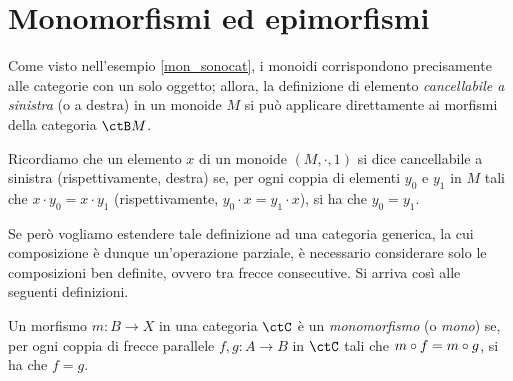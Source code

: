 \section{Monomorfismi ed epimorfismi}\label{sec_monoepi}

Come visto nell'esempio \ref{mon_sonocat}, i monoidi corrispondono precisamente alle categorie con un solo oggetto; allora,
la definizione di elemento \emph{cancellabile a sinistra} (o a destra) in un monoide \(M\) si può applicare direttamente ai morfismi della categoria \(\ctB M\).

Ricordiamo che un elemento \(x\) di un monoide \((M, \cdot, 1)\) si dice cancellabile a sinistra (rispettivamente, destra) se,
per ogni coppia di elementi \(y_0\) e \(y_1\) in \(M\) tali che \(x \cdot y_0 = x \cdot y_1\) (rispettivamente, \(y_0 \cdot x = y_1 \cdot x\)), si ha che \(y_0 = y_1\).

Se però vogliamo estendere tale definizione ad una categoria generica,
la cui composizione è dunque un'operazione parziale,
è necessario considerare solo le composizioni ben definite, ovvero tra frecce consecutive.
Si arriva così alle seguenti definizioni.

\begin{definition}[Monomorfismo]\label{def_Mono}
	Un morfismo \(m \colon B \to X\) in una categoria \(\ctC\) è un \emph{monomorfismo} (o \emph{mono}) se,
	per ogni coppia di frecce parallele \(f, g \colon A \to B\) in \(\ctC\) tali che \(m \circ f = m \circ g\), si ha che \(f = g\).
\end{definition}

